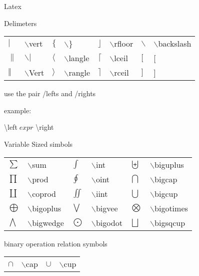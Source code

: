 \begin{section}{Latex}
\begin{subsection}{Delimeters}
\begin{tabular}{ |m{0.8cm}|m{2.2cm}|m{0.8cm}|m{2.2cm}|m{0.8cm}|m{2.2cm}|m{0.8cm}|m{2.2cm}|  }
		
			$\vert$ & $\backslash$vert &
			$\{$ & $\backslash$\} &
			$\rfloor$ & $\backslash$rfloor &
			$\backslash$ & $\backslash$backslash \\
		
		
			$\|$ & $\backslash \vert$ &
			$\langle$ & $\backslash$langle &
			$\lceil$ & $\backslash$lceil &
			$[$ & [ \\
		
			$\Vert$ & $\backslash$Vert &
			$\rangle$ & $\backslash$rangle &
			$\rceil$ & $\backslash$rceil &
			$]$ & ] \\
		\hline
		\end{tabular}

		use the pair /lefts and /rights

		example:

		\textbackslash left\textbar $\;expr$ \textbackslash right\textbar
		\newpage
	
	\end{subsection}

	\begin{subsection}{Variable Sized simbols}
		\begin{tabular}{ |m{1cm}|m{2.5cm}|m{1cm}|m{2.5cm} |m{1cm}|m{2.5cm}| }
		\hline
			$\sum$ & $\backslash$sum &
			$\int$ & $\backslash$int &
			$\biguplus$ & $\backslash$biguplus \\
		
			$\prod$ & $\backslash$prod &
			$\oint$ & $\backslash$oint &
			$\bigcap$ & $\backslash$bigcap \\
		
			$\coprod$ & $\backslash$coprod &
			$\iint$ & $\backslash$iint &
			$\bigcup$ & $\backslash$bigcup \\
		
			$\bigoplus$ & $\backslash$bigoplus &
			$\bigvee$ & $\backslash$bigvee &
			$\bigotimes$ & $\backslash$bigotimes \\
		
			$\bigwedge$ & $\backslash$bigwedge &
			$\bigodot$ & $\backslash$bigodot &
			$\bigsqcup$ & $\backslash$bigsqcup \\

		\hline
		\end{tabular}
	
	\end{subsection}

	\begin{subsection}{binary operation relation symbols}
		\begin{tabular}{ |m{1cm}|m{3cm}|m{1cm}|m{3cm} | }
		\hline
			$\cap$ & $\backslash$cap &
			$\cup$ & $\backslash$cup \\
		

\end{tabular}
\end{subsection}
\end{section}

